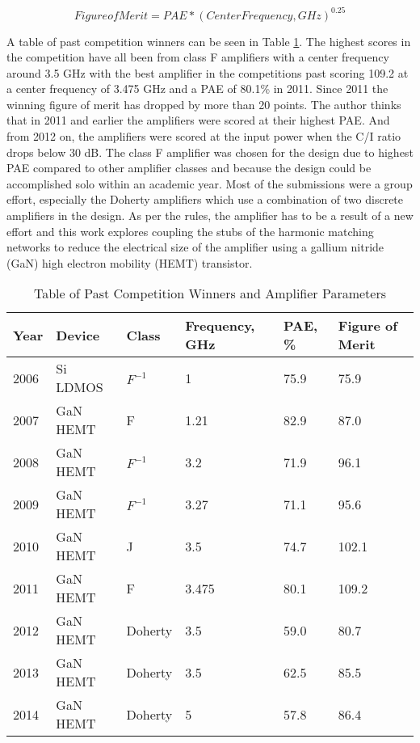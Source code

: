 \begin{equation}\label{eq:fom}
  Figure of Merit = PAE*(Center Frequency, GHz)^{0.25}
\end{equation}

A table of past competition winners can be seen in Table \ref{table:past_amp_val}. The highest scores in the competition have all been from class F amplifiers with a center frequency around 3.5 GHz with the best amplifier in the competitions past scoring 109.2 at a center frequency of 3.475 GHz and a PAE of 80.1\% in 2011. Since 2011 the winning figure of merit has dropped by more than 20 points. The author thinks that in 2011 and earlier the amplifiers were scored at their highest PAE. And from 2012 on, the amplifiers were scored at the input power when the C/I ratio drops below 30 dB. The class F amplifier was chosen for the design due to highest PAE compared to other amplifier classes and because the design could be accomplished solo within an academic year. Most of the submissions were a group effort, especially the Doherty amplifiers which use a combination of two discrete amplifiers in the design. As per the rules, the amplifier has to be a result of a new effort and this work explores coupling the stubs of the harmonic matching networks to reduce the electrical size of the amplifier using a gallium nitride (GaN) high electron mobility (HEMT) transistor.

\begin{table}
    \centering

    \label{table:past_amp_val}
    \caption{Table of Past Competition Winners and Amplifier Parameters}

    \begin{tabular}{|l|l|l|l|l|l|}
      \hline
      {Year} & {Device} & {Class} & {Frequency, GHz} & {PAE, \%} & {Figure of Merit} \\ \hline
      2006 & {Si LDMOS} & {$F^{-1}$}  & {1}     & {75.9} & {75.9} \\ \hline
      2007 & {GaN HEMT} & F         & {1.21}  & {82.9} & {87.0} \\ \hline
      2008 & {GaN HEMT} & {$F^{-1}$}  & {3.2}   & {71.9} & {96.1} \\ \hline
      2009 & {GaN HEMT} & {$F^{-1}$}  & {3.27}  & {71.1} & {95.6} \\ \hline
      2010 & {GaN HEMT} & {J}       & {3.5}   & {74.7} & {102.1} \\ \hline
      2011 & {GaN HEMT} & F         & {3.475} & {80.1} & {109.2} \\ \hline
      2012 & {GaN HEMT} & {Doherty} & {3.5}   & {59.0} & {80.7} \\ \hline
      2013 & {GaN HEMT} & {Doherty} & {3.5}   & {62.5} & {85.5} \\ \hline
      2014 & {GaN HEMT} & {Doherty} & {5}     & {57.8} & {86.4} \\ \hline
      \hline
    \end{tabular}
\end{table}
